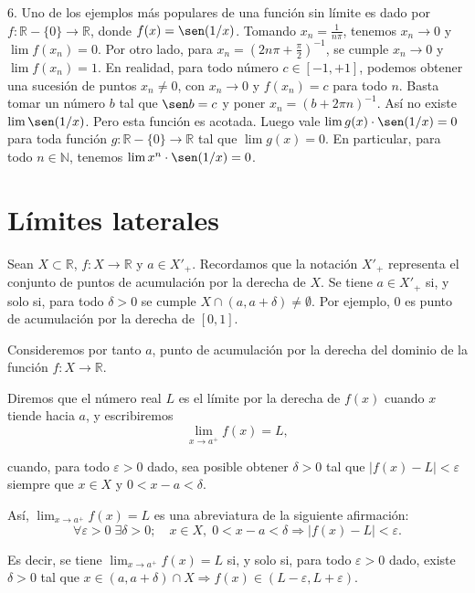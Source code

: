 \documentclass[12pt,oneside]{book}
\begin{document}
6. Uno de los ejemplos más populares de una función sin límite es dado por \( f: \mathbb{R} - \{0\} \to \mathbb{R} \), donde \( f(x) = \sen(1/x) \). Tomando \( x_n = \frac{1}{n\pi} \), tenemos \( x_n \to 0 \) y \( \lim f(x_n) = 0 \). Por otro lado, para \( x_n = \left(2n\pi + \frac{\pi}{2}\right)^{-1} \), se cumple \( x_n \to 0 \) y \( \lim f(x_n) = 1 \). En realidad, para todo número \( c \in [-1, +1] \), podemos obtener una sucesión de puntos \( x_n \neq 0 \), con \( x_n \to 0 \) y \( f(x_n) = c \) para todo \( n \). Basta tomar un número \( b \) tal que \( \sen b = c \) y poner \( x_n = (b + 2\pi n)^{-1} \). Así no existe \( \lim \sen(1/x) \). Pero esta función es acotada. Luego vale \( \lim g(x) \cdot \sen(1/x) = 0 \) para toda función \( g: \mathbb{R} - \{0\} \to \mathbb{R} \) tal que \( \lim g(x) = 0 \). En particular, para todo \( n \in \mathbb{N} \), tenemos \( \lim x^n \cdot \sen(1/x) = 0 \).

\section{Límites laterales}

Sean \( X \subset \mathbb{R} \), \( f: X \to \mathbb{R} \) y \( a \in X'_+ \). Recordamos que la notación \( X'_+ \) representa el conjunto de puntos de acumulación por la derecha de \( X \). Se tiene \( a \in X'_+ \) si, y solo si, para todo \( \delta > 0 \) se cumple \( X \cap (a, a + \delta) \neq \emptyset \). Por ejemplo, \( 0 \) es punto de acumulación por la derecha de \( [0, 1] \).

Consideremos por tanto \( a \), punto de acumulación por la derecha del dominio de la función \( f: X \to \mathbb{R} \).

Diremos que el número real \( L \) es el límite por la derecha de \( f(x) \) cuando \( x \) tiende hacia \( a \), y escribiremos
\[
\lim_{x \to a^+} f(x) = L,
\]

cuando, para todo \( \varepsilon > 0 \) dado, sea posible obtener \( \delta > 0 \) tal que \( |f(x) - L| < \varepsilon \) siempre que \( x \in X \) y \( 0 < x - a < \delta \).

Así, \( \lim_{x \to a^+} f(x) = L \) es una abreviatura de la siguiente afirmación:
\[
\forall \varepsilon > 0 \; \exists \delta > 0; \quad x \in X, \; 0 < x - a < \delta \Rightarrow |f(x) - L| < \varepsilon.
\]

Es decir, se tiene \( \lim_{x \to a^+} f(x) = L \) si, y solo si, para todo \( \varepsilon > 0 \) dado, existe \( \delta > 0 \) tal que \( x \in (a, a + \delta) \cap X \Rightarrow f(x) \in (L - \varepsilon, L + \varepsilon) \).
\end{document}

